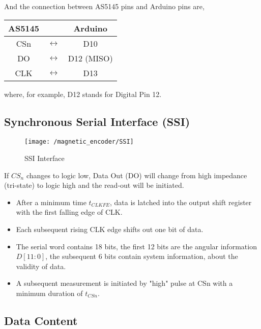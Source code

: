 \noindent And the connection between AS5145 pins and Arduino pins are,


\begin{center}
	\begin{tabular}{|c c c|}
	\hline AS5145 & & \multicolumn{1}{c|}{Arduino}	\\
	\hline CSn	&	$\leftrightarrow$ &	D10 \\
	DO	&	$\leftrightarrow$ &	D12 (MISO) \\
	CLK	&	$\leftrightarrow$ &	D13	\\ \hline	
	\end{tabular}
\end{center}

\noindent where, for example, D12 stands for Digital Pin 12.

\newpage
\subsection{Synchronous Serial Interface (SSI)}

\begin{figure}[h!]
	\begin{center}
		\texttt{[image: /magnetic\_encoder/SSI]}
		\caption{SSI Interface}
		\label{SSI AS5145}
	\end{center}
\end{figure}

If $CS_n$ changes to logic low, Data Out (DO) will change from high impedance (tri-state) to logic high and the read-out will be initiated.

\begin{itemize}
	\item	After a minimum time $t_{CLK FE}$, data is latched into the output shift register with the first falling edge of CLK.
	\item Each subsequent rising CLK edge shifts out one bit of data.
	\item The serial word contains 18 bits, the first 12 bits are the angular information $D[11:0]$, the subsequent 6 bits contain system information, about the validity of data.
	\item A subsequent measurement is initiated by "high" pulse at CSn with a minimum duration of $t_{CSn}$.
\end{itemize}


\subsection{Data Content}

